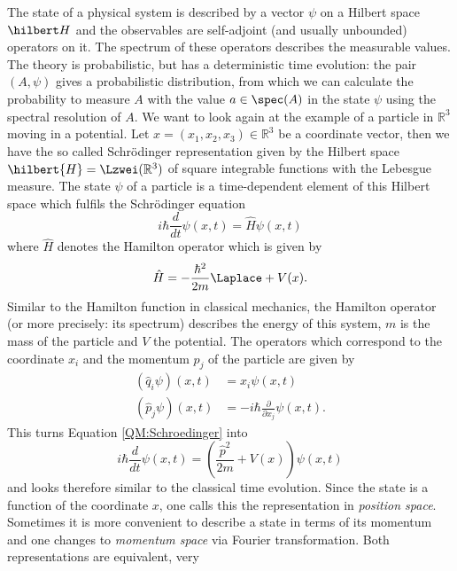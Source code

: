 The state of a physical system is described by a vector $\psi$ on a 
Hilbert space $\hilbert H$ and the observables are self-adjoint (and 
usually unbounded) operators on it. The spectrum of these operators describes 
the measurable values. The theory is probabilistic, but has a deterministic 
time evolution: the pair $(A, \psi)$ gives a probabilistic distribution, 
from which we can calculate the probability to measure $A$ with the value $a 
\in \spec (A)$ in the state $\psi$ using the spectral resolution of $A$. We 
want to look again at the example of a particle in $\mathbb{R}^3$ 
moving in a potential. Let $x = (x_1, x_2, x_3) \in \mathbb{R}^3$ be a 
coordinate vector, then we have the so called Schr\"odinger representation 
given by the Hilbert space $\hilbert{H} = \Lzwei(\mathbb{R}^3)$ of square 
integrable functions with the Lebesgue measure. The state $\psi$ of a particle 
is a time-dependent element of this Hilbert space which fulfils the 
Schr\"odinger equation
\begin{equation}
	\label{QM:Schroedinger}
	i \hbar \frac{d}{dt} \psi(x, t)
	=
	\hat{H}
	\psi(x, t)
\end{equation}
where $\hat{H}$ denotes the Hamilton operator which is given by
\begin{equation}
	\hat{H}
	=
	- \frac{\hbar^2}{2 m}
	\Laplace + V(x).
\end{equation}
Similar to the Hamilton function in classical mechanics, the Hamilton operator 
(or more precisely: its spectrum) describes the energy of this system, $m$ is the 
mass of the particle and $V$ the potential. The operators which correspond to 
the coordinate $x_i$ and the momentum $p_j$ of the particle are given by
\begin{align*}
	\left( \hat{q}_i
	\psi \right) (x, t)
	&=
	x_i
	\psi(x, t)
	\\
	\left( \hat{p}_j
	\psi \right) (x, t)
	&=
	- i \hbar 
	\frac{\partial}{\partial x_j}
	\psi(x, t).
\end{align*}
This turns Equation \eqref{QM:Schroedinger} into
\begin{equation*}
	i \hbar \frac{d}{dt} \psi(x, t)
	=
	\left( \frac{\hat{p}^2}{2m} + V(x) \right)
	\psi(x, t)
\end{equation*}
and looks therefore similar to the classical time evolution.
Since the  state is a function of the coordinate $x$, one calls this the 
representation in \emph{position space}. Sometimes it is more convenient to 
describe a state in terms of its momentum and one changes to \emph{momentum 
space} via Fourier transformation. Both representations are equivalent, very 
